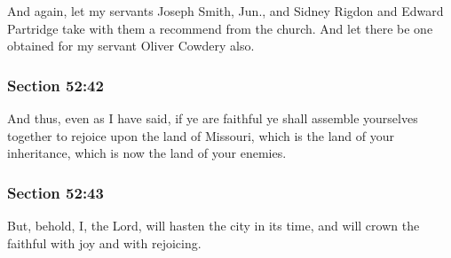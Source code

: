 		And again, let my servants Joseph Smith, Jun., and Sidney Rigdon and Edward Partridge take with them a recommend from the church.  And let there be one obtained for my servant Oliver Cowdery also.


	\subsubsection{Section 52:42} %
		\label{DC52-42}

		And thus, even as I have said, if ye are faithful ye shall assemble yourselves together to rejoice upon the land of Missouri, which is the land of your inheritance, which is now the land of your enemies.


	\subsubsection{Section 52:43} %
		\label{DC52-43}

		But, behold, I, the Lord, will hasten the city in its time, and will crown the faithful with joy and with rejoicing.


